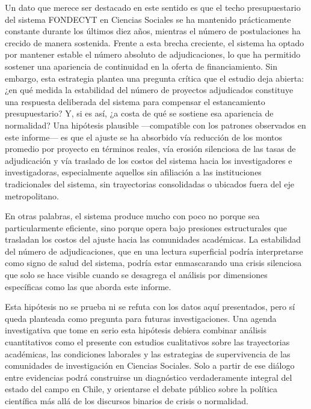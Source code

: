 \documentclass[
  12pt,
  letterpaper,
]{article}
\begin{document}
Un dato que merece ser destacado en este sentido es que el techo
presupuestario del sistema FONDECYT en Ciencias Sociales se ha mantenido
prácticamente constante durante los últimos diez años, mientras el
número de postulaciones ha crecido de manera sostenida. Frente a esta
brecha creciente, el sistema ha optado por mantener estable el número
absoluto de adjudicaciones, lo que ha permitido sostener una apariencia
de continuidad en la oferta de financiamiento. Sin embargo, esta
estrategia plantea una pregunta crítica que el estudio deja abierta: ¿en
qué medida la estabilidad del número de proyectos adjudicados constituye
una respuesta deliberada del sistema para compensar el estancamiento
presupuestario? Y, si es así, ¿a costa de qué se sostiene esa apariencia
de normalidad? Una hipótesis plausible ---compatible con los patrones
observados en este informe--- es que el ajuste se ha absorbido vía
reducción de los montos promedio por proyecto en términos reales, vía
erosión silenciosa de las tasas de adjudicación y vía traslado de los
costos del sistema hacia los investigadores e investigadoras,
especialmente aquellos sin afiliación a las instituciones tradicionales
del sistema, sin trayectorias consolidadas o ubicados fuera del eje
metropolitano.

En otras palabras, el sistema produce mucho con poco no porque sea
particularmente eficiente, sino porque opera bajo presiones
estructurales que trasladan los costos del ajuste hacia las comunidades
académicas. La estabilidad del número de adjudicaciones, que en una
lectura superficial podría interpretarse como signo de salud del
sistema, podría estar enmascarando una crisis silenciosa que solo se
hace visible cuando se desagrega el análisis por dimensiones específicas
como las que aborda este informe.

Esta hipótesis no se prueba ni se refuta con los datos aquí presentados,
pero sí queda planteada como pregunta para futuras investigaciones. Una
agenda investigativa que tome en serio esta hipótesis debiera combinar
análisis cuantitativos como el presente con estudios cualitativos sobre
las trayectorias académicas, las condiciones laborales y las estrategias
de supervivencia de las comunidades de investigación en Ciencias
Sociales. Solo a partir de ese diálogo entre evidencias podrá
construirse un diagnóstico verdaderamente integral del estado del campo
en Chile, y orientarse el debate público sobre la política científica
más allá de los discursos binarios de crisis o normalidad.

\newpage{}
\end{document}
